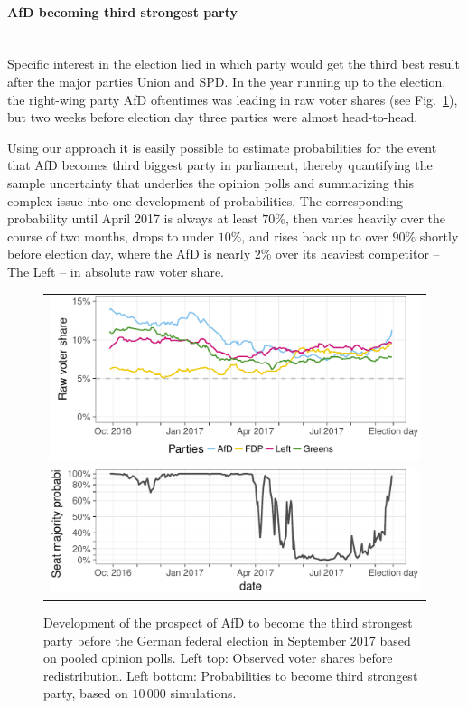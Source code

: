 \documentclass[smallcondensed]{svjour3}     %
\begin{document}
\paragraph{AfD becoming third strongest party} \ \\
Specific interest in the election lied in which party would
get the third best result after the major parties Union and SPD.
In the year running up to the election, the right-wing party
AfD oftentimes was leading in raw voter shares (see Fig.~\ref{fig:2017_afd}),
but two weeks before election day three parties were almost
head-to-head.

Using our approach it is easily possible to estimate probabilities
for the event that AfD becomes third biggest party in parliament,
thereby quantifying the sample uncertainty that underlies the
opinion polls and summarizing this complex issue into one
development of probabilities.
The corresponding probability until April 2017
is always at least $70\%$, then varies heavily over the course
of two months, drops to under $10\%$, and rises back up to
over $90\%$ shortly before election day, where the AfD is
nearly $2\%$ over its heaviest competitor -- The Left -- in
absolute raw voter share.

\begin{figure}[H]\centering
\begin{tabular}{l}
\includegraphics[height=.2\textwidth]{figures/2017_pooled_afd_rawShares.pdf}
\\
\includegraphics[height=.15\textwidth]{figures/2017_pooled_afd_thirdPartyProb.pdf}
\end{tabular}
\caption{Development of the prospect of AfD to become the third strongest party before the German federal election in September 2017 based on pooled opinion polls.
Left top: Observed voter shares before redistribution. Left bottom: Probabilities to become third strongest party, based on $10\,000$ simulations.
\label{fig:2017_afd}
}
\end{figure}
\end{document}
